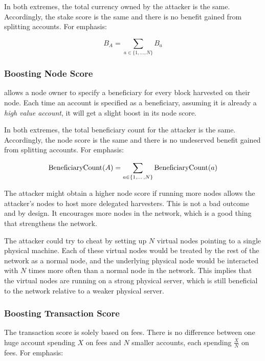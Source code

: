 In both extremes, the total currency owned by the attacker is the same.
Accordingly, the stake score is the same and there is no benefit gained from splitting accounts.
For emphasis:

\begin{equation}
	B_A = \sum\limits_{a \in \{1, \dotso, N\}} B_a
\end{equation}

\subsubsection*{Boosting Node Score}

\codenamespace allows a node owner to specify a beneficiary for every block harvested on their node.
Each time an account is specified as a beneficiary, assuming it is already a \emph{high value account}, it will get a slight boost in its node score.

In both extremes, the total beneficiary count for the attacker is the same.
Accordingly, the node score is the same and there is no undeserved benefit gained from splitting accounts.
For emphasis:

\begin{equation}
	\mathrm{BeneficiaryCount}(A) = \sum\limits_{a \in \{1, \dotso, N\}} \mathrm{BeneficiaryCount}(a)
\end{equation}

The attacker might obtain a higher node score if running more nodes allows the attacker's nodes to host more delegated harvesters.
This is not a bad outcome and by design.
It encourages more nodes in the network, which is a good thing that strengthens the network.

The attacker could try to cheat by setting up $N$ virtual nodes pointing to a single physical machine.
Each of these virtual nodes would be treated by the rest of the network as a normal node, and the underlying physical node would be interacted with $N$ times more often than a normal node in the network.
This implies that the virtual nodes are running on a strong physical server, which is still beneficial to the network relative to a weaker physical server.

\subsubsection*{Boosting Transaction Score}

The transaction score is solely based on fees.
There is no difference between one huge account spending $X$ on fees and $N$ smaller accounts, each spending $\frac{X}{N}$ on fees.
For emphasis:

